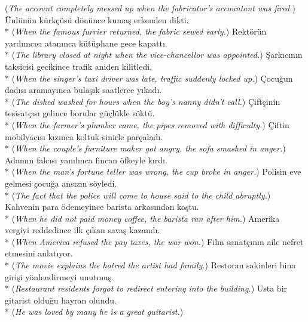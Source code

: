 ({\it * The account completely messed up when the fabricator's accountant was fired.})
\ex * \"{U}nl\"{u}n\"{u}n k\"{u}rk\c{c}\"{u}s\"{u} d\"{o}n\"{u}nce kuma\c{s} erkenden dikti. \\*
({\it * When the famous furrier returned, the fabric sewed early.})
\ex * Rekt\"{o}r\"{u}n yard{\i}mc{\i}s{\i} atan{\i}nca k\"{u}t\"{u}phane gece kapatt{\i}. \\*
({\it * The library closed at night when the vice-chancellor was appointed.})
\ex * \c{S}ark{\i}c{\i}n{\i}n taksicisi gecikince trafik aniden kilitledi. \\*
({\it * When the singer's taxi driver was late, traffic suddenly locked up.})
\ex * \c{C}ocu\u{g}un dad{\i}s{\i} aramay{\i}nca bula\c{s}{\i}k saatlerce y{\i}kad{\i}. \\*
({\it * The dished washed for hours when the boy's nanny didn't call.})
\ex * \c{C}ift\c{c}inin tesisat\c{c}{\i}s{\i} gelince borular g\"{u}\c{c}l\"{u}kle s\"{o}kt\"{u}. \\*
({\it * When the farmer's plumber came, the pipes removed with difficulty.})
\ex * \c{C}iftin mobilyac{\i}s{\i} k{\i}z{\i}nca koltuk sinirle par\c{c}alad{\i}. \\*
({\it * When the couple's furniture maker got angry, the sofa smashed in anger.})
\ex * Adam{\i}n falc{\i}s{\i} yan{\i}l{\i}nca fincan \"{o}fkeyle k{\i}rd{\i}. \\*
({\it * When the man's fortune teller was wrong, the cup broke in anger.})
\ex * Polisin eve gelmesi \c{c}ocu\u{g}a ans{\i}z{\i}n s\"{o}yledi. \\*
({\it * The fact that the police will come to house said to the child abruptly.})
\ex * Kahvenin para \"{o}demeyince barista arkas{\i}ndan ko\c{s}tu. \\*
({\it * When he did not paid money coffee, the barista ran after him.})
\ex * Amerika vergiyi reddedince ilk \c{c}{\i}kan sava\c{s} kazand{\i}. \\*
({\it * When America refused the pay taxes, the war won.})
\ex * Film sanat\c{c}{\i}n{\i}n aile nefret etmesini anlat{\i}yor. \\*
({\it * The movie explains the hatred the artist had family.})
\ex * Restoran sakinleri bina giri\c{s}i y\"{o}nlendirmeyi unutmu\c{s}. \\*
({\it * Restaurant residents forgot to redirect entering into the building.})
\ex * Usta bir gitarist oldu\u{g}u hayran olundu. \\*
({\it * He was loved by many he is a great guitarist.})
